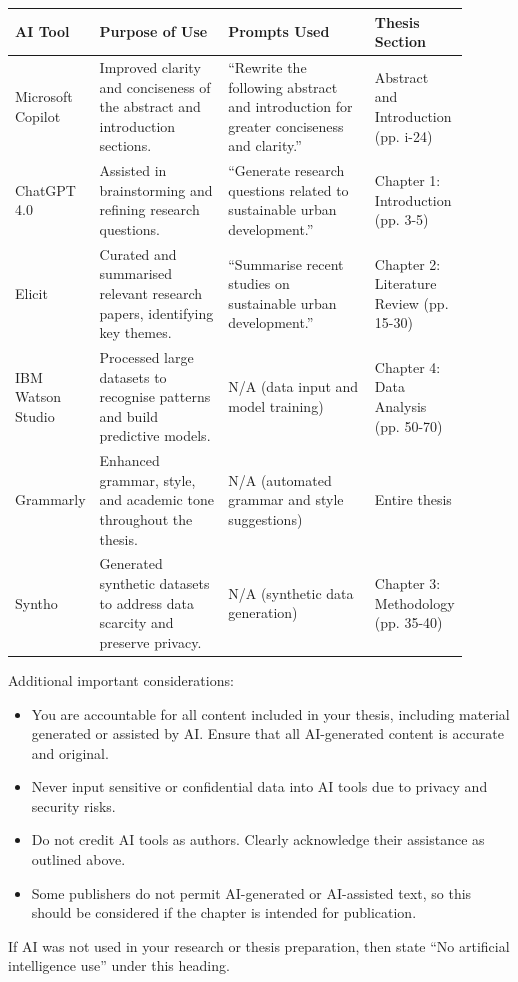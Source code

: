 \begin{instructional}
    \noindent
    \begin{table}[h]
    {\color{UQPurple}
        \begin{tabular}{|p{0.10\linewidth} | p{0.30\linewidth} | p{0.35\linewidth} | p{0.15\linewidth}|}
        \hline
        \textbf{AI Tool} & \textbf{Purpose of Use} & \textbf{Prompts Used} & \textbf{Thesis Section} \\
        \hline
        Microsoft Copilot & Improved clarity and conciseness of the abstract and introduction sections. & ``Rewrite the following abstract and introduction for greater conciseness and clarity.'' & Abstract and Introduction (pp. i-24) \\
        \hline
        ChatGPT 4.0 & Assisted in brainstorming and refining research questions. & ``Generate research questions related to sustainable urban development.'' & Chapter 1: Introduction (pp. 3-5) \\
        \hline
        Elicit & Curated and summarised relevant research papers, identifying key themes. & ``Summarise recent studies on sustainable urban development.'' & Chapter 2: Literature Review (pp. 15-30) \\
        \hline
        IBM Watson Studio & Processed large datasets to recognise patterns and build predictive models. & N/A (data input and model training) & Chapter 4: Data Analysis (pp. 50-70) \\
        \hline
        Grammarly & Enhanced grammar, style, and academic tone throughout the thesis. & N/A (automated grammar and style suggestions) & Entire thesis \\
        \hline
        Syntho & Generated synthetic datasets to address data scarcity and preserve privacy. & N/A (synthetic data generation) & Chapter 3: Methodology (pp. 35-40) \\
        \hline
        \end{tabular}
    }
    \end{table}

    \noindent
    Additional important considerations:

    \begin{itemize}
        \item You are accountable for all content included in your thesis, including material generated or assisted by AI. Ensure that all AI-generated content is accurate and original.
        \item Never input sensitive or confidential data into AI tools due to privacy and security risks.
        \item Do not credit AI tools as authors. Clearly acknowledge their assistance as outlined above.
        \item Some publishers do not permit AI-generated or AI-assisted text, so this should be considered if the chapter is intended for publication.
    \end{itemize}
    
    \noindent
    If AI was not used in your research or thesis preparation, then state ``No artificial intelligence use'' under this heading. 

\end{instructional}

